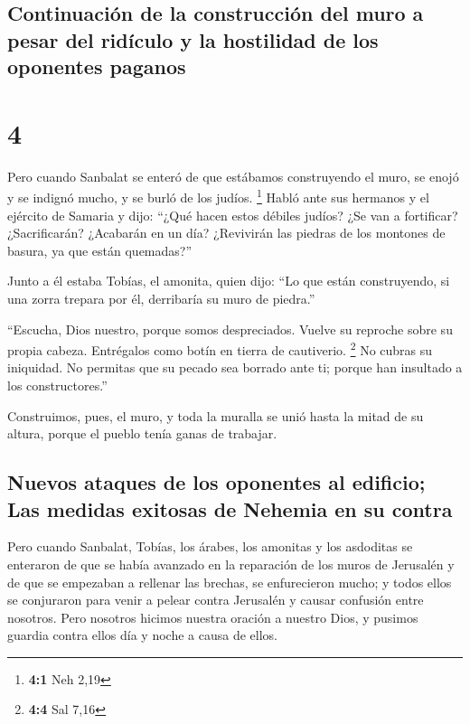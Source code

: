 \hypertarget{continuaciuxf3n-de-la-construcciuxf3n-del-muro-a-pesar-del-riduxedculo-y-la-hostilidad-de-los-oponentes-paganos}{%
\subsection{Continuación de la construcción del muro a pesar del
ridículo y la hostilidad de los oponentes
paganos}\label{continuaciuxf3n-de-la-construcciuxf3n-del-muro-a-pesar-del-riduxedculo-y-la-hostilidad-de-los-oponentes-paganos}}

\hypertarget{section-3}{%
\section{4}\label{section-3}}

 Pero cuando Sanbalat se enteró de que estábamos
construyendo el muro, se enojó y se indignó mucho, y se burló de los
judíos. \footnote{\textbf{4:1} Neh 2,19}  Habló ante sus
hermanos y el ejército de Samaria y dijo: ``¿Qué hacen estos débiles
judíos? ¿Se van a fortificar? ¿Sacrificarán? ¿Acabarán en un día?
¿Revivirán las piedras de los montones de basura, ya que están
quemadas?''

 Junto a él estaba Tobías, el amonita, quien dijo: ``Lo
que están construyendo, si una zorra trepara por él, derribaría su muro
de piedra.''

 ``Escucha, Dios nuestro, porque somos despreciados.
Vuelve su reproche sobre su propia cabeza. Entrégalos como botín en
tierra de cautiverio. \footnote{\textbf{4:4} Sal 7,16}  No
cubras su iniquidad. No permitas que su pecado sea borrado ante ti;
porque han insultado a los constructores.''

 Construimos, pues, el muro, y toda la muralla se unió
hasta la mitad de su altura, porque el pueblo tenía ganas de trabajar.

\hypertarget{nuevos-ataques-de-los-oponentes-al-edificio-las-medidas-exitosas-de-nehemia-en-su-contra}{%
\subsection{Nuevos ataques de los oponentes al edificio; Las medidas
exitosas de Nehemia en su
contra}\label{nuevos-ataques-de-los-oponentes-al-edificio-las-medidas-exitosas-de-nehemia-en-su-contra}}

 Pero cuando Sanbalat, Tobías, los árabes, los amonitas y
los asdoditas se enteraron de que se había avanzado en la reparación de
los muros de Jerusalén y de que se empezaban a rellenar las brechas, se
enfurecieron mucho;  y todos ellos se conjuraron para
venir a pelear contra Jerusalén y causar confusión entre nosotros.
 Pero nosotros hicimos nuestra oración a nuestro Dios, y
pusimos guardia contra ellos día y noche a causa de ellos.

